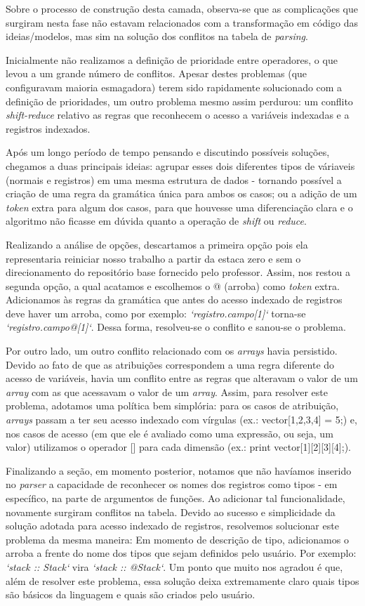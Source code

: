 \documentclass{article}
\begin{document}
Sobre o processo de construção desta camada, observa-se que as complicações que surgiram nesta fase não estavam relacionados com a transformação em código das ideias/modelos, mas sim na solução dos conflitos na tabela de \textit{parsing}. 

Inicialmente não realizamos a definição de prioridade entre operadores, o que levou a um grande número de conflitos. Apesar destes problemas (que configuravam maioria esmagadora) terem sido rapidamente solucionado com a definição de prioridades, um outro problema mesmo assim perdurou: um conflito \textit{shift-reduce} relativo as regras que reconhecem o acesso a variáveis indexadas e a registros indexados. 

Após um longo período de tempo pensando e discutindo possíveis soluções, chegamos a duas principais ideias: agrupar esses dois diferentes tipos de váriaveis (normais e registros) em uma mesma estrutura de dados - tornando possível a criação de uma regra da gramática única para ambos os casos; ou a adição de um \textit{token} extra para algum dos casos, para que houvesse uma diferenciação clara e o algoritmo não ficasse em dúvida quanto a operação de \textit{shift} ou \textit{reduce}.

Realizando a análise de opções, descartamos a primeira opção pois ela representaria reiniciar nosso trabalho a partir da estaca zero e sem o direcionamento do repositório base fornecido pelo professor. Assim, nos restou a segunda opção, a qual acatamos e escolhemos o @ (arroba) como \textit{token} extra. Adicionamos às regras da gramática que antes do acesso indexado de registros deve haver um arroba, como por exemplo: \textit{`registro.campo[1]`} torna-se \textit{`registro.campo@[1]`}. Dessa forma, resolveu-se o conflito e sanou-se o problema.

Por outro lado, um outro conflito relacionado com os \textit{arrays} havia persistido. Devido ao fato de que as atribuições correspondem a uma regra diferente do acesso de variáveis, havia um conflito entre as regras que alteravam o valor de um \textit{array} com as que acessavam o valor de um \textit{array}. Assim, para resolver este problema, adotamos uma política bem simplória: para os casos de atribuição, \textit{arrays} passam a ter seu acesso indexado com vírgulas (ex.: vector[1,2,3,4] = 5;) e, nos casos de acesso (em que ele é avaliado como uma expressão, ou seja, um valor) utilizamos o operador [] para cada dimensão (ex.: print vector[1][2][3][4];).

Finalizando a seção, em momento posterior, notamos que não havíamos inserido no \textit{parser} a capacidade de reconhecer os nomes dos registros como tipos - em específico, na parte de argumentos de funções. Ao adicionar tal funcionalidade, novamente surgiram conflitos na tabela. Devido ao sucesso e simplicidade da solução adotada para acesso indexado de registros, resolvemos solucionar este problema da mesma maneira: Em momento de descrição de tipo, adicionamos o arroba a frente do nome dos tipos que sejam definidos pelo usuário. Por exemplo: \textit{`stack :: Stack`} vira \textit{`stack :: @Stack`}. Um ponto que muito nos agradou é que, além de resolver este problema, essa solução deixa extremamente claro quais tipos são básicos da linguagem e quais são criados pelo usuário.
\end{document}

